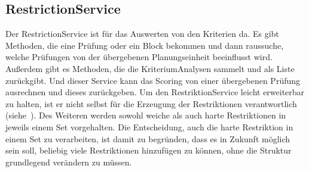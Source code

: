 \subsection{RestrictionService}\label{subsec:RestrictionService}
Der RestrictionService ist für das Auswerten von den Kriterien da.
Es gibt Methoden, die eine Prüfung oder ein Block bekommen und dann raussuche, welche Prüfungen
von der übergebenen Planungseinheit beeinflusst wird.
Außerdem gibt es Methoden, die die KriteriumAnalysen sammelt und als Liste zurückgibt.
Und dieser Service kann das Scoring von einer übergebenen Prüfung ausrechnen und dieses zurückgeben.
Um den RestriktionService leicht erweiterbar zu halten, ist er nicht selbst für die Erzeugung der Restriktionen
verantwortlich (siehe~).
Des Weiteren werden sowohl weiche als auch harte Restriktionen in jeweils einem Set vorgehalten.
Die Entscheidung, auch die harte Restriktion in einem Set zu verarbeiten, ist damit zu begründen, dass
es in Zukunft möglich sein soll, beliebig viele Restriktionen hinzufügen zu können, ohne die Struktur
grundlegend verändern zu müssen.